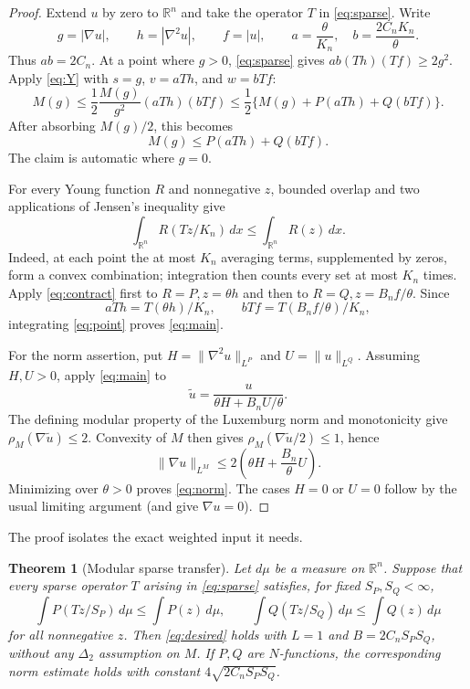\documentclass[11pt,a4paper]{article}
\newtheorem{theorem}{Theorem}
\newcommand{\R}{\mathbb R}
\begin{document}
\begin{proof}
Extend $u$ by zero to $\R^n$ and take the operator $T$ in
\eqref{eq:sparse}.  Write
\[
 g=|\nabla u|,\qquad h=|\nabla^2u|,\qquad f=|u|,
 \qquad a=\frac{\theta}{K_n},\quad
 b=\frac{2C_nK_n}{\theta}.
\]
Thus $ab=2C_n$.  At a point where $g>0$, \eqref{eq:sparse} gives
$ab(Th)(Tf)\ge2g^2$.  Apply \eqref{eq:Y} with
$s=g$, $v=aTh$, and $w=bTf$:
\[
 M(g)
 \le \frac12\frac{M(g)}{g^2}(aTh)(bTf)
 \le \frac12\{M(g)+P(aTh)+Q(bTf)\}.
\]
After absorbing $M(g)/2$, this becomes
\begin{equation}\label{eq:point}
 M(g)\le P(aTh)+Q(bTf).
\end{equation}
The claim is automatic where $g=0$.

For every Young function $R$ and nonnegative $z$, bounded overlap and two
applications of Jensen's inequality give
\begin{equation}\label{eq:contract}
 \int_{\R^n}R(Tz/K_n)\,dx\le\int_{\R^n}R(z)\,dx.
\end{equation}
Indeed, at each point the at most $K_n$ averaging terms, supplemented by
zeros, form a convex combination; integration then counts every set at most
$K_n$ times.  Apply \eqref{eq:contract} first to
$R=P,z=\theta h$ and then to $R=Q,z=B_nf/\theta$.  Since
\[
 aTh=T(\theta h)/K_n,\qquad
 bTf=T(B_nf/\theta)/K_n,
\]
integrating \eqref{eq:point} proves \eqref{eq:main}.

For the norm assertion, put
$H=\|\nabla^2u\|_{L^P}$ and $U=\|u\|_{L^Q}$.  Assuming $H,U>0$, apply
\eqref{eq:main} to
\[
 \widetilde u=\frac{u}{\theta H+B_nU/\theta}.
\]
The defining modular property of the Luxemburg norm and monotonicity give
$\rho_M(\nabla\widetilde u)\le2$.  Convexity of $M$ then gives
$\rho_M(\nabla\widetilde u/2)\le1$, hence
\[
 \|\nabla u\|_{L^M}
 \le2\left(\theta H+\frac{B_n}{\theta}U\right).
\]
Minimizing over $\theta>0$ proves \eqref{eq:norm}.  The cases $H=0$ or
$U=0$ follow by the usual limiting argument (and give $\nabla u=0$).
\end{proof}

The proof isolates the exact weighted input it needs.

\begin{theorem}[Modular sparse transfer]\label{thm:transfer}
Let $d\mu$ be a measure on $\R^n$.  Suppose that every sparse operator $T$
arising in \eqref{eq:sparse} satisfies, for fixed $S_P,S_Q<\infty$,
\begin{equation}\label{eq:transfer}
 \int P(Tz/S_P)\,d\mu\le\int P(z)\,d\mu,
 \qquad
 \int Q(Tz/S_Q)\,d\mu\le\int Q(z)\,d\mu
\end{equation}
for all nonnegative $z$.  Then \eqref{eq:desired} holds with
$L=1$ and $B=2C_nS_PS_Q$, without any $\Delta_2$ assumption on $M$.
If $P,Q$ are $N$-functions, the corresponding norm estimate holds with
constant $4\sqrt{2C_nS_PS_Q}$.
\end{theorem}
\end{document}
